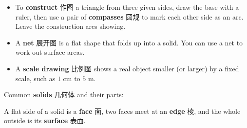 \documentclass[11pt]{article}
\begin{document}
\begin{itemize}
\item To \textbf{construct} 作图 a triangle from three given sides, draw the base with a ruler, then use a pair of \textbf{compasses} 圆规 to mark each other side as an arc. Leave the construction arcs showing.

\item A \textbf{net} 展开图 is a flat shape that folds up into a solid. You can use a net to work out surface areas.

\item A \textbf{scale drawing} 比例图 shows a real object smaller (or larger) by a fixed scale, such as $1\text{ cm}$ to $5\text{ m}$.

\end{itemize}

Common \textbf{solids} 几何体 and their parts:

\begin{center}
\end{center}

A flat side of a solid is a \textbf{face} 面, two faces meet at an \textbf{edge} 棱, and the whole outside is its \textbf{surface} 表面.
\end{document}
